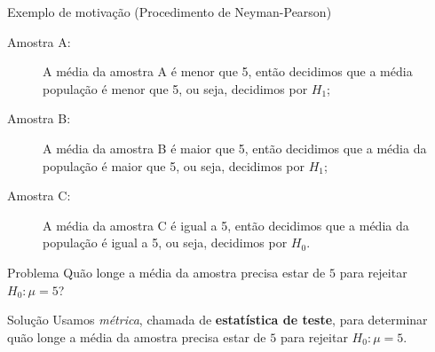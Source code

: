 \documentclass[8pt]{beamer}
\begin{document}
\begin{frame}{Exemplo de motivação (Procedimento de Neyman-Pearson)}

\begin{description}
 \item[Amostra A:] A média da amostra A é menor que 5, então decidimos que a média população é menor que 5, ou seja, decidimos por $H_1$;
 \vfill
 
 \item[Amostra B:] A média da amostra B é maior que 5, então decidimos que a média da população é maior que 5, ou seja, decidimos por $H_1$;
 \vfill
 
 \item[Amostra C:] A média da amostra C é igual a 5, então decidimos que a média da população é igual a 5, ou seja, decidimos por $H_0$.
\end{description}

\begin{block}{Problema}
	Quão longe a média da amostra precisa estar de $5$ para rejeitar $H_0: \mu = 5$?
\end{block}

\begin{block}{Solução}
	Usamos \textit{métrica}, chamada de \textbf{estatística de teste}, para determinar quão longe a média da amostra precisa estar de $5$ para rejeitar $H_0: \mu = 5$.
\end{block}
 
\end{frame}
\end{document}
